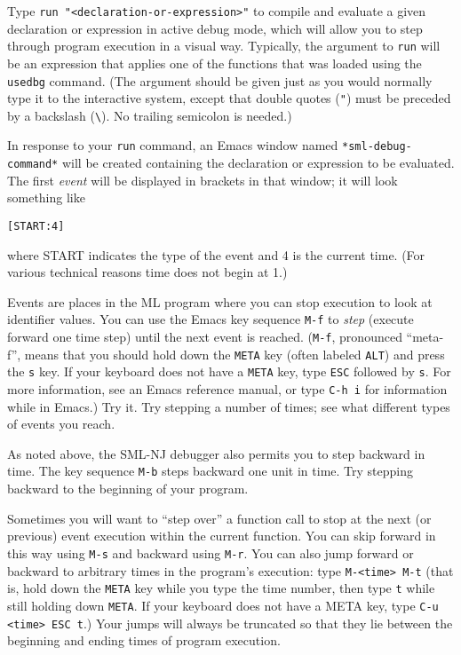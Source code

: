 Type \verb'run "<declaration-or-expression>"' to compile and evaluate a
given declaration or expression in active debug mode, which will allow you 
to step through program execution in a visual way.  
Typically, the argument to \verb'run' will be an expression that applies
one of the functions that was loaded using the \verb'usedbg' command. 
(The argument should be given just as you would normally type
it to the interactive system, except that double quotes (\verb'"') must 
be preceded by a backslash (\verb'\'). No trailing semicolon is needed.)

In response to your \verb'run' command, an Emacs window named
\verb'*sml-debug-command*' will be created containing the declaration or
expression to be evaluated. The first {\em event} will be displayed 
in brackets in that window; it will look something like

\begin{verbatim}
[START:4]
\end{verbatim}
where START indicates the type of the event and 4 is the current
time.  (For various technical reasons time does not begin at 1.)

Events are places in the ML program where you can stop execution to
look at identifier values.  You can use the Emacs key sequence \verb'M-f' to
{\em step} (execute forward one time step) until the next event is reached.
(\verb'M-f', pronounced ``meta-f'', means that you should hold down
the \verb'META' key (often labeled \verb'ALT') and press the \verb's'
key.  If your keyboard does not have a \verb'META' key,
type \verb'ESC' followed by \verb's'.  For more information, see an
Emacs reference manual, or type \verb'C-h i' for information while in Emacs.)
Try it.  Try stepping a number of times; see what different types of
events you reach.

As noted above, the SML-NJ debugger also permits you to step {\em}
backward in time.  The key sequence \verb'M-b' steps backward one unit in
time.  Try stepping backward to the beginning of your program.

Sometimes you will want to ``step over'' a function call to stop at the
next (or previous) event execution within the current function.
You can skip forward in this way using \verb'M-s' and backward using 
\verb'M-r'.
You can also jump forward or backward to arbitrary times in the 
program's execution: type \verb'M-<time> M-t' (that is,
hold down the \verb'META' key while you type the time number,
then type \verb't' while still holding down \verb'META'.  If your
keyboard does not have a META key, type \verb'C-u <time> ESC t'.)
Your jumps will always be truncated so that they lie between the
beginning and ending times of program execution.


